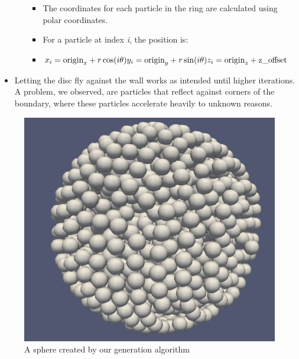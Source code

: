 \documentclass{article}
\begin{document}
\begin{itemize}
\begin{enumerate}
        \begin{itemize}
            \item The coordinates for each particle in the ring are calculated using polar coordinates.
            \item For a particle at index \textit{i}, the position is:
            \item $x_i = \text{origin}_x + r \cos(i \theta)\newline y_i = \text{origin}_y + r \sin(i \theta)\newline z_i = \text{origin}_z + \text{z\_offset}$
        \end{itemize}
    \end{enumerate}
    \item Letting the disc fly against the wall works as intended until higher iterations. A problem, we observed, are particles that reflect against corners of the boundary, where these particles accelerate heavily to unknown reasons.
\end{itemize}

\begin{figure}[H]
    \includegraphics[width=\textwidth]{res/sphere}
    \caption{A sphere created by our generation algorithm}
    \label{fig:sphere}
\end{figure}
\end{document}
